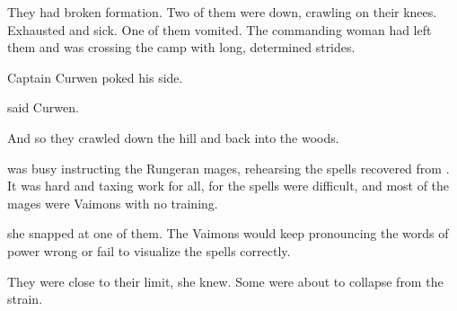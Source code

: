 They had broken formation. 
Two of them were down, crawling on their knees. 
Exhausted and sick. 
One of them vomited. 
The commanding woman had left them and was crossing the camp with long, determined strides. 


Captain Curwen poked his side. 

said Curwen.

And so they crawled down the hill and back into the woods. 








\begin{comment}
\subsection{\Takestsha{} notices \vertex{}}
\end{comment}
\new
% 
\Takestsha{} was busy instructing the Rungeran mages, rehearsing the spells recovered from \EreshKal. 
It was hard and taxing work for all, for the \EreshKali{} spells were difficult, and most of the mages were Vaimons with no \rethyactic{} training. 

she snapped at one of them. 
The Vaimons would keep pronouncing the words of power wrong or fail to visualize the spells correctly. 

They were close to their limit, she knew. 
Some were about to collapse from the strain. 

